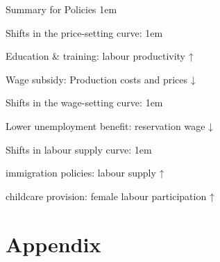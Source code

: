\documentclass[11pt,aspectratio=43,usenames,dvipsnames]{beamer}
\let\olditemize=\itemize
\let\endolditemize=\enditemize
\renewenvironment{itemize}{\olditemize \itemsep1em}{\endolditemize}
\let\oldenumerate=\enumerate
\let\endoldenumerate=\endenumerate
\renewenvironment{enumerate}{\oldenumerate \itemsep1em}{ \endoldenumerate}
\theoremstyle{definition}
\begin{document}
\begin{frame}{Summary for Policies}
\label{slide:Summary_for_Policies}
    \begin{itemize}
        \item Shifts in the price-setting curve:
        \begin{enumerate}
            \item Education \& training: labour productivity ↑
            \item Wage subsidy: Production costs and prices ↓
        \end{enumerate}
        \item Shifts in the wage-setting curve:
        \begin{enumerate}
            \item Lower unemployment benefit: reservation wage ↓
        \end{enumerate}
        \item Shifts in labour supply curve:
        \begin{enumerate}
            \item immigration policies: labour supply ↑
            \item childcare provision: female labour participation ↑
        \end{enumerate}
    \end{itemize}
\end{frame}




\section{Appendix}
\label{sec:Appendix}
\end{document}
